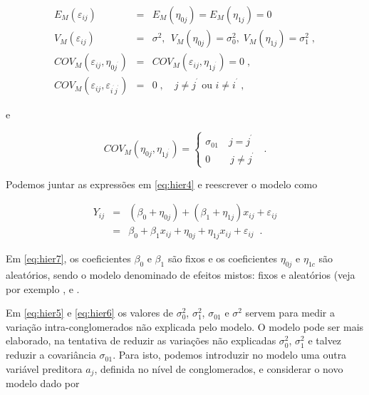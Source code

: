 \documentclass[]{book}
\theoremstyle{definition}
\theoremstyle{definition}
\theoremstyle{definition}
\theoremstyle{remark}
\begin{document}
\begin{eqnarray}
E_{M}\left( \varepsilon _{ij}\right) &=&E_{M}\left( \eta _{0j}\right)
=E_{M}\left( \eta _{1j}\right) =0  \label{eq:hier5} \\
V_{M}\left( \varepsilon _{ij}\right) &=&\sigma ^{2},\:\:V_{M}\left(
\eta _{0j}\right) =\sigma _{0}^{2},\;V_{M}\left( \eta _{1j}\right)
=\sigma _{1}^{2}\;,  \nonumber \\
COV_{M}\left( \varepsilon _{ij},\eta _{0j^{^{\prime }}}\right)
&=&COV_{M}\left( \varepsilon _{ij},\eta _{1j^{^{\prime }}}\right) =0\;, 
\nonumber \\
COV_{M}\left( \varepsilon _{ij},\varepsilon _{i^{^{\prime }}j^{^{\prime
}}}\right) &=&0\;,\quad j\neq j^{^{\prime }}\mbox{ ou }i\neq i^{^{\prime
}}\;,  \nonumber
\end{eqnarray}

e

\begin{equation}
COV_{M}\left( \eta _{0j},\eta _{1j^{^{\prime }}}\right) =\left\{ 
\begin{array}{l}
\sigma _{01}\quad j=j^{^{\prime }} \\ 
0\quad \quad j\neq j^{^{\prime }}
\end{array}
\right. \;\;.  \label{eq:hier6}
\end{equation}

Podemos juntar as expressões em \eqref{eq:hier4} e reescrever o modelo
como

\begin{eqnarray}
Y_{ij} &=&\left( \beta _{0}+\eta _{0j}\right) +\left( \beta _{1}+\eta
_{1j}\right) x_{ij}+\varepsilon _{ij}  \label{eq:hier7} \\
&=&\beta _{0}+\beta _{1}x_{ij}+\eta _{0j}+\eta _{1j}x_{ij}+\varepsilon
_{ij}\;\;.  \nonumber
\end{eqnarray}

Em \eqref{eq:hier7}, os coeficientes \(\beta _{0}\) e \(\beta _{1}\) são
fixos e os coeficientes \(\eta _{0j}\) e \(\eta _{1c}\) são aleatórios,
sendo o modelo denominado de efeitos mistos: fixos e aleatórios (veja
por exemplo \citep{Longford}, \citep{diggle} e \citep{bryk}.

Em \eqref{eq:hier5} e \eqref{eq:hier6} os valores de \(\sigma _{0}^{2}\),
\(\sigma _{1}^{2}\), \(\sigma _{01}\) e \(\sigma ^{2}\) servem para
medir a variação intra-conglomerados não explicada pelo modelo. O modelo
pode ser mais elaborado, na tentativa de reduzir as variações não
explicadas \(\sigma _{0}^{2}\), \(\sigma _{1}^{2}\) e talvez reduzir a
covariância \(\sigma _{01}\). Para isto, podemos introduzir no modelo
uma outra variável preditora \(a_{j}\), definida no nível de
conglomerados, e considerar o novo modelo dado por
\end{document}
